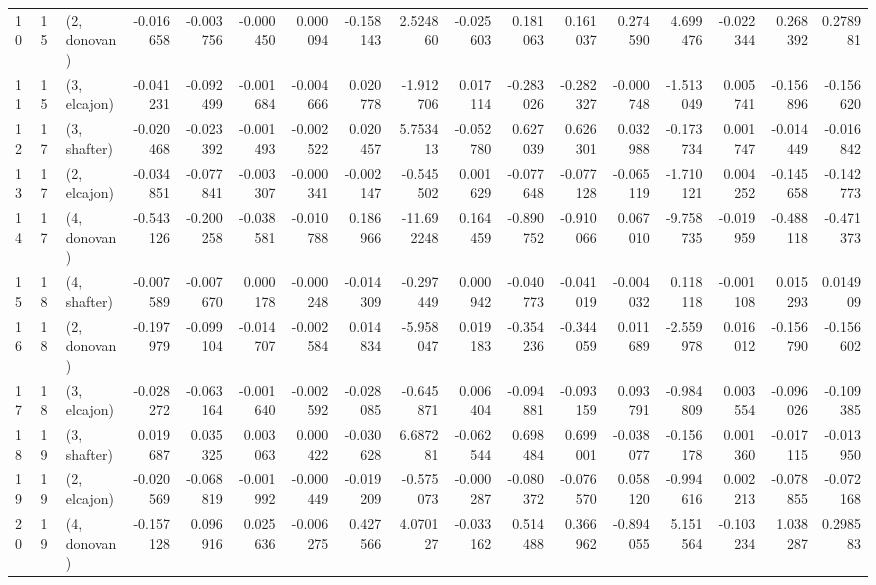 \begin{tabular}{lllrrrrrrrrrrrrrr}
10 &    15 &  (2, donovan) & -0.016658 & -0.003756 &  -0.000450 &  0.000094 & -0.158143 &   2.524860 & -0.025603 &   0.181063 &  0.161037 &  0.274590 &   4.699476 & -0.022344 &  0.268392 &  0.278981 \\
11 &    15 &  (3, elcajon) & -0.041231 & -0.092499 &  -0.001684 & -0.004666 &  0.020778 &  -1.912706 &  0.017114 &  -0.283026 & -0.282327 & -0.000748 &  -1.513049 &  0.005741 & -0.156896 & -0.156620 \\
12 &    17 &  (3, shafter) & -0.020468 & -0.023392 &  -0.001493 & -0.002522 &  0.020457 &   5.753413 & -0.052780 &   0.627039 &  0.626301 &  0.032988 &  -0.173734 &  0.001747 & -0.014449 & -0.016842 \\
13 &    17 &  (2, elcajon) & -0.034851 & -0.077841 &  -0.003307 & -0.000341 & -0.002147 &  -0.545502 &  0.001629 &  -0.077648 & -0.077128 & -0.065119 &  -1.710121 &  0.004252 & -0.145658 & -0.142773 \\
14 &    17 &  (4, donovan) & -0.543126 & -0.200258 &  -0.038581 & -0.010788 &  0.186966 & -11.692248 &  0.164459 &  -0.890752 & -0.910066 &  0.067010 &  -9.758735 & -0.019959 & -0.488118 & -0.471373 \\
15 &    18 &  (4, shafter) & -0.007589 & -0.007670 &   0.000178 & -0.000248 & -0.014309 &  -0.297449 &  0.000942 &  -0.040773 & -0.041019 & -0.004032 &   0.118118 & -0.001108 &  0.015293 &  0.014909 \\
16 &    18 &  (2, donovan) & -0.197979 & -0.099104 &  -0.014707 & -0.002584 &  0.014834 &  -5.958047 &  0.019183 &  -0.354236 & -0.344059 &  0.011689 &  -2.559978 &  0.016012 & -0.156790 & -0.156602 \\
17 &    18 &  (3, elcajon) & -0.028272 & -0.063164 &  -0.001640 & -0.002592 & -0.028085 &  -0.645871 &  0.006404 &  -0.094881 & -0.093159 &  0.093791 &  -0.984809 &  0.003554 & -0.096026 & -0.109385 \\
18 &    19 &  (3, shafter) &  0.019687 &  0.035325 &   0.003063 &  0.000422 & -0.030628 &   6.687281 & -0.062544 &   0.698484 &  0.699001 & -0.038077 &  -0.156178 &  0.001360 & -0.017115 & -0.013950 \\
19 &    19 &  (2, elcajon) & -0.020569 & -0.068819 &  -0.001992 & -0.000449 & -0.019209 &  -0.575073 & -0.000287 &  -0.080372 & -0.076570 &  0.058120 &  -0.994616 &  0.002213 & -0.078855 & -0.072168 \\
20 &    19 &  (4, donovan) & -0.157128 &  0.096916 &   0.025636 & -0.006275 &  0.427566 &   4.070127 & -0.033162 &   0.514488 &  0.366962 & -0.894055 &   5.151564 & -0.103234 &  1.038287 &  0.298583 \\

\end{tabular}

